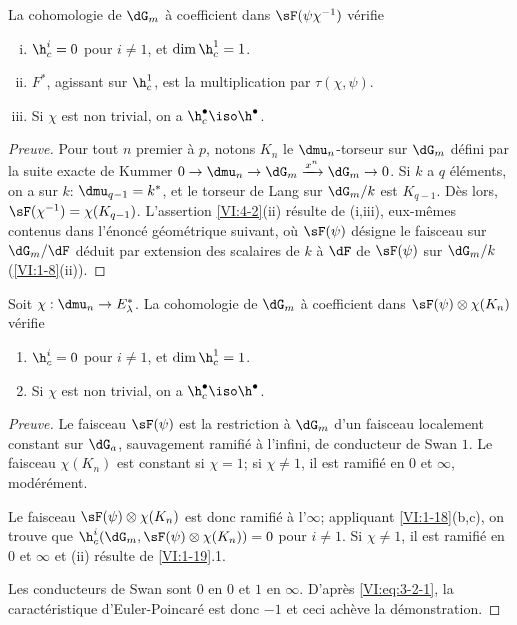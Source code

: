 \begin{proposition_}\label{VI:4-2}
La cohomologie de $\dG_m$ à coefficient dans $\sF(\psi\chi^{-1})$ vérifie 
\begin{enumerate}[(i)]
  \item $\h_c^i=0$ pour $i\ne 1$, et $\dim \h_c^1=1$. 
  \item $F^\ast$, agissant sur $\h_c^1$, est la multiplication par 
    $\tau(\chi,\psi)$. 
  \item Si $\chi$ est non trivial, on a $\h_c^\bullet \iso \h^\bullet$. 
\end{enumerate}
\end{proposition_}
\begin{proof}[Preuve]
Pour tout $n$ premier à $p$, notons $K_n$ le $\dmu_n$-torseur sur $\dG_m$ 
défini par la suite exacte de Kummer 
$0 \to \dmu_n \to \dG_m \xrightarrow{x^n} \dG_m \to 0$. Si $k$ a $q$ 
éléments, on a sur $k$: $\dmu_{q-1}=k^\ast$, et le torseur de Lang sur 
$\dG_m/k$ est $K_{q-1}$. Dès lors, $\sF(\chi^{-1})=\chi(K_{q-1})$. 
L'assertion \ref{VI:4-2}(ii) résulte de (i,iii), eux-mêmes contenus dans 
l'énoncé géométrique suivant, où $\sF(\psi)$ désigne le faisceau 
sur $\dG_m/\dF$ déduit par extension des scalaires de $k$ à $\dF$ de 
$\sF(\psi)$ sur $\dG_m/k$ (\ref{VI:1-8}(ii)). 
\end{proof}





\begin{proposition_}\label{VI:4-3}
Soit $\chi:\dmu_n \to E_\lambda^\ast$. La cohomologie de $\dG_m$ à 
coefficient dans $\sF(\psi)\otimes \chi(K_n)$ vérifie 
\begin{enumerate}[\indent (i)]
  \item $\h_c^i=0$ pour $i\ne 1$, et $\dim \h_c^1{} = 1$. 
  \item Si $\chi$ est non trivial, on a $\h_c^\bullet{}\iso \h^\bullet{}$. 
\end{enumerate}
\end{proposition_}
\begin{proof}[Preuve]
Le faisceau $\sF(\psi)$ est la restriction à $\dG_m$ d'un faisceau localement 
constant sur $\dG_a$, sauvagement ramifié à l'infini, de conducteur de 
Swan $1$. Le faisceau $\chi(K_n)$ est constant si $\chi=1$; si $\chi\ne 1$, il 
est ramifié en $0$ et $\infty$, modérément. 

Le faisceau $\sF(\psi)\otimes\chi(K_n)$ est donc ramifié à l'$\infty$; 
appliquant \ref{VI:1-18}(b,c), on trouve que 
$\h_c^i(\dG_m,\sF(\psi)\otimes \chi(K_n))=0$ pour $i\ne 1$. Si $\chi\ne 1$, il 
est ramifié en $0$ et $\infty$ et (ii) résulte de \ref{VI:1-19}.1. 

Les conducteurs de Swan sont $0$ en $0$ et $1$ en $\infty$. D'après 
\eqref{VI:eq:3-2-1}, la caractéristique d'Euler-Poincaré est donc $-1$ et 
ceci achève la démonstration. 
\end{proof}





